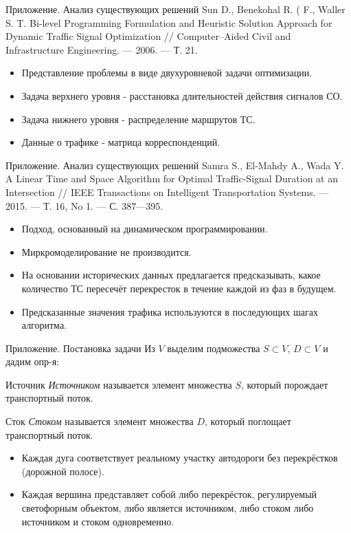 \documentclass[aspectratio=169]{beamer}
\begin{document}
	\begin{frame}{Приложение. Анализ существующих решений}
		Sun D., Benekohal R. ( F., Waller S. T. Bi-level Programming Formulation
		and Heuristic Solution Approach for Dynamic Traffic Signal Optimization // Computer–Aided Civil and Infrastructure Engineering. — 2006. — Т. 21.
		\begin{itemize}
			\item Представление проблемы в виде двухуровневой задачи оптимизации.
			\item Задача верхнего уровня - расстановка длительностей действия сигналов СО.
			\item Задача нижнего уровня - распределение маршрутов ТС.
			\item Данные о трафике - матрица корреспонденций.
		\end{itemize}
	\end{frame}
	\begin{frame}{Приложение. Анализ существующих решений}
		Samra S., El-Mahdy A., Wada Y. A Linear Time and Space Algorithm for
		Optimal Traffic-Signal Duration at an Intersection // IEEE Transactions on Intelligent
		Transportation Systems. — 2015. — Т. 16, No 1. — С. 387—395.
		\begin{itemize}
			\item Подход, основанный на динамическом программировании.
			\item Миркромоделирование не производится.
			\item На основании исторических данных предлагается предсказывать, какое количество ТС пересечёт перекресток в течение каждой из фаз в будущем.
			\item Предсказанные значения трафика используются в последующих шагах алгоритма.
		\end{itemize}
	\end{frame}
	
	\begin{frame}{Приложение. Постановка задачи}
		Из $V$ выделим подможества $S\subset V$, $D\subset V$ и дадим опр-я:
		\begin{block}{Источник}
			\textit{Источником} называется элемент множества $S$, который порождает транспортный поток.
		\end{block}
		\begin{block}{Сток}
			\textit{Стоком} называется элемент множества $D$, который поглощает транспортный поток.
		\end{block}
		\begin{itemize}
			\item Каждая дуга соответствует реальному участку автодороги без перекрёстков
			(дорожной полосе).
			\item Каждая вершина представляет собой либо перекрёсток, регу­лируемый светофорным объектом, либо является источником, либо стоком либо
			источником и стоком одновременно.
		\end{itemize}
		
	\end{frame}
	
\end{document}
